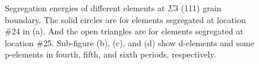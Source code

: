 \begingroup
\begin{figure}[!ht]
  \centering
\caption[Segregation energies of different elements at $\Sigma$3 (111) grain boundary.]{Segregation energies of different elements at $\Sigma$3 (111) grain boundary. The solid circles are for elements segregated at location \#24 in (a). And the open triangles are for elements segregated at location \#25. Sub-figure (b), (c), and (d) show d-elements and some p-elements in fourth, fifth, and sixth periods, respectively.}
\label{Chap:Ag/ZnO:fig19}
\end{figure}
\endgroup


